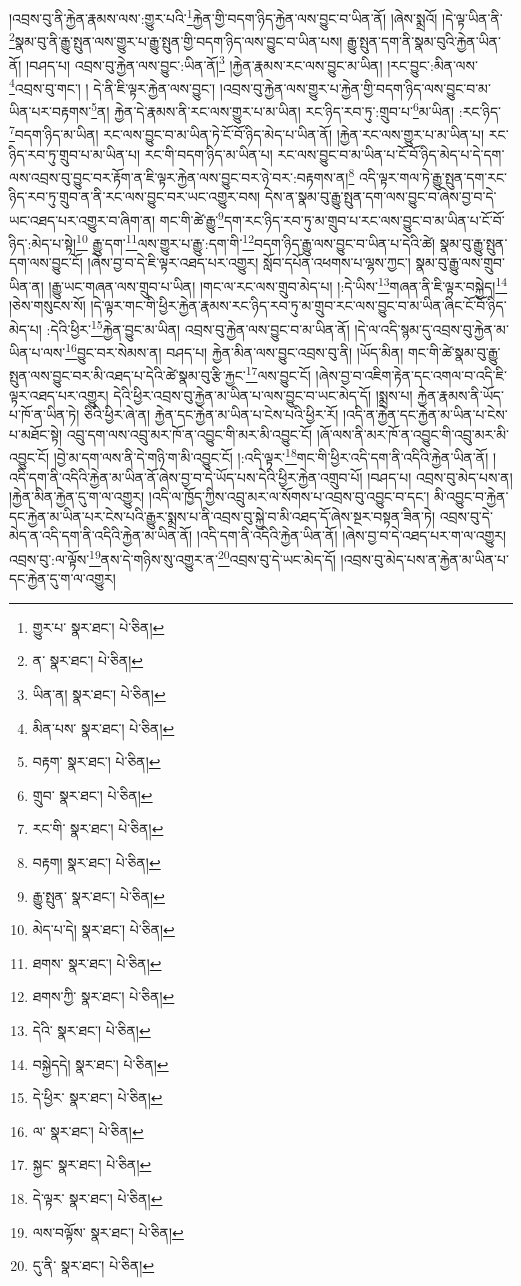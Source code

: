 །འབྲས་བུ་ནི་རྐྱེན་རྣམས་ལས་:གྱུར་པའི་\footnote{གྱུར་པ་  སྣར་ཐང་།  པེ་ཅིན། }རྐྱེན་གྱི་བདག་ཉིད་རྐྱེན་ལས་བྱུང་བ་ཡིན་ནོ། །ཞེས་སྨྲའོ། །དེ་ལྟ་ཡིན་ནི་\footnote{ན་  སྣར་ཐང་།  པེ་ཅིན། }སྣམ་བུ་ནི་རྒྱུ་སྤུན་ལས་གྱུར་པ་རྒྱུ་སྤུན་གྱི་བདག་ཉིད་ལས་བྱུང་བ་ཡིན་པས། རྒྱུ་སྤུན་དག་ནི་སྣམ་བུའི་རྐྱེན་ཡིན་ནོ། །བཤད་པ། འབྲས་བུ་རྐྱེན་ལས་བྱུང་:ཡིན་ནོ།\footnote{ཡིན་ན།  སྣར་ཐང་།  པེ་ཅིན། } །རྐྱེན་རྣམས་རང་ལས་བྱུང་མ་ཡིན། །རང་བྱུང་:མིན་ལས་\footnote{མིན་པས་  སྣར་ཐང་།  པེ་ཅིན། }འབྲས་བུ་གང་། །
དེ་ནི་ཇི་ལྟར་རྐྱེན་ལས་བྱུང་། །འབྲས་བུ་རྐྱེན་ལས་གྱུར་པ་རྐྱེན་གྱི་བདག་ཉིད་ལས་བྱུང་བ་མ་ཡིན་པར་བརྟགས་\footnote{བརྟག་  སྣར་ཐང་།  པེ་ཅིན། }ན། རྐྱེན་དེ་རྣམས་ནི་རང་ལས་གྱུར་པ་མ་ཡིན། རང་ཉིད་རབ་ཏུ་:གྲུབ་པ་\footnote{གྲུབ་  སྣར་ཐང་།  པེ་ཅིན། }མ་ཡིན། :རང་ཉིད་\footnote{རང་གི་  སྣར་ཐང་།  པེ་ཅིན། }བདག་ཉིད་མ་ཡིན། རང་ལས་བྱུང་བ་མ་ཡིན་ཏེ་ངོ་བོ་ཉིད་མེད་པ་ཡིན་ནོ། །རྐྱེན་རང་ལས་གྱུར་པ་མ་ཡིན་པ། རང་ཉིད་རབ་ཏུ་གྲུབ་པ་མ་ཡིན་པ། རང་གི་བདག་ཉིད་མ་ཡིན་པ། རང་ལས་བྱུང་བ་མ་ཡིན་པ་ངོ་བོ་ཉིད་མེད་པ་དེ་དག་ལས་འབྲས་བུ་བྱུང་བར་རྟོག་ན་ཇི་ལྟར་རྐྱེན་ལས་བྱུང་བར་ཉེ་བར་:བརྟགས་ན།\footnote{བརྟག།  སྣར་ཐང་།  པེ་ཅིན། } འདི་ལྟར་གལ་ཏེ་རྒྱུ་སྤུན་དག་རང་ཉིད་རབ་ཏུ་གྲུབ་ན་ནི་རང་ལས་བྱུང་བར་ཡང་འགྱུར་བས། དེས་ན་སྣམ་བུ་རྒྱུ་སྤུན་དག་ལས་བྱུང་བ་ཞེས་བྱ་བ་དེ་ཡང་འཐད་པར་འགྱུར་བ་ཞིག་ན། གང་གི་ཚེ་རྒྱུ་\footnote{རྒྱུ་སྤུན་  སྣར་ཐང་།  པེ་ཅིན། }དག་རང་ཉིད་རབ་ཏུ་མ་གྲུབ་པ་རང་ལས་བྱུང་བ་མ་ཡིན་པ་ངོ་བོ་ཉིད་:མེད་པ་སྟེ།\footnote{མེད་པ་དེ།  སྣར་ཐང་།  པེ་ཅིན། } རྒྱུ་དག་\footnote{ཐགས་  སྣར་ཐང་།  པེ་ཅིན། }ལས་གྱུར་པ་རྒྱུ་:དག་གི་\footnote{ཐགས་ཀྱི་  སྣར་ཐང་།  པེ་ཅིན། }བདག་ཉིད་རྒྱུ་ལས་བྱུང་བ་ཡིན་པ་དེའི་ཚེ། སྣམ་བུ་རྒྱུ་སྤུན་དག་ལས་བྱུང་ངོ། །ཞེས་བྱ་བ་དེ་ཇི་ལྟར་འཐད་པར་འགྱུར། སློབ་དཔོན་འཕགས་པ་ལྷས་ཀྱང་། སྣམ་བུ་རྒྱུ་ལས་གྲུབ་ཡིན་ན། །རྒྱུ་ཡང་གཞན་ལས་གྲུབ་པ་ཡིན། །གང་ལ་རང་ལས་གྲུབ་མེད་པ། །:དེ་ཡིས་\footnote{དེའི་  སྣར་ཐང་།  པེ་ཅིན། }གཞན་ནི་ཇི་ལྟར་བསྐྱེད།\footnote{བསྐྱེདདེ།  སྣར་ཐང་།  པེ་ཅིན། } །ཅེས་གསུངས་སོ། །དེ་ལྟར་གང་གི་ཕྱིར་རྐྱེན་རྣམས་རང་ཉིད་རབ་ཏུ་མ་གྲུབ་རང་ལས་བྱུང་བ་མ་ཡིན་ཞིང་ངོ་བོ་ཉིད་མེད་པ། :དེའི་ཕྱིར་\footnote{དེ་ཕྱིར་  སྣར་ཐང་།  པེ་ཅིན། }རྐྱེན་བྱུང་མ་ཡིན། འབྲས་བུ་རྐྱེན་ལས་བྱུང་བ་མ་ཡིན་ནོ། །དེ་ལ་འདི་སྙམ་དུ་འབྲས་བུ་རྐྱེན་མ་ཡིན་པ་ལས་\footnote{ལ་  སྣར་ཐང་།  པེ་ཅིན། }བྱུང་བར་སེམས་ན། བཤད་པ། རྐྱེན་མིན་ལས་བྱུང་འབྲས་བུ་ནི། །ཡོད་མིན། གང་གི་ཚེ་སྣམ་བུ་རྒྱུ་སྤུན་ལས་བྱུང་བར་མི་འཐད་པ་དེའི་ཚེ་སྣམ་བུ་རྩི་རྐྱང་\footnote{སྐྱང་  སྣར་ཐང་།  པེ་ཅིན། }ལས་བྱུང་ངོ། །ཞེས་བྱ་བ་འཇིག་རྟེན་དང་འགལ་བ་འདི་ཇི་ལྟར་འཐད་པར་འགྱུར། དེའི་ཕྱིར་འབྲས་བུ་རྐྱེན་མ་ཡིན་པ་ལས་བྱུང་བ་ཡང་མེད་དོ། །སྨྲས་པ། རྐྱེན་རྣམས་ནི་ཡོད་པ་ཁོ་ན་ཡིན་ཏེ། ཅིའི་ཕྱིར་ཞེ་ན། རྐྱེན་དང་རྐྱེན་མ་ཡིན་པ་ངེས་པའི་ཕྱིར་རོ། །འདི་ན་རྐྱེན་དང་རྐྱེན་མ་ཡིན་པ་ངེས་པ་མཐོང་སྟེ། འབྲུ་དག་ལས་འབྲུ་མར་ཁོ་ན་འབྱུང་གི་མར་མི་འབྱུང་ངོ། །ཞོ་ལས་ནི་མར་ཁོ་ན་འབྱུང་གི་འབྲུ་མར་མི་འབྱུང་ངོ། །བྱེ་མ་དག་ལས་ནི་དེ་གཉི་ག་མི་འབྱུང་ངོ། །:འདི་ལྟར་\footnote{དེ་ལྟར་  སྣར་ཐང་།  པེ་ཅིན། }གང་གི་ཕྱིར་འདི་དག་ནི་འདིའི་རྐྱེན་ཡིན་ནོ། །འདི་དག་ནི་འདིའི་རྐྱེན་མ་ཡིན་ནོ་ཞེས་བྱ་བ་དེ་ཡོད་པས་དེའི་ཕྱིར་རྐྱེན་འགྲུབ་པོ། །བཤད་པ། འབྲས་བུ་མེད་པས་ན། །རྐྱེན་མིན་རྐྱེན་དུ་ག་ལ་འགྱུར། །འདི་ལ་ཁྱོད་ཀྱིས་འབྲུ་མར་ལ་སོགས་པ་འབྲས་བུ་འབྱུང་བ་དང་། མི་འབྱུང་བ་རྐྱེན་དང་རྐྱེན་མ་ཡིན་པར་ངེས་པའི་རྒྱུར་སྨྲས་པ་ནི་འབྲས་བུ་སྐྱེ་བ་མི་འཐད་དོ་ཞེས་སྔར་བསྟན་ཟིན་ཏེ། འབྲས་བུ་དེ་མེད་ན་འདི་དག་ནི་འདིའི་རྐྱེན་མ་ཡིན་ནོ། །འདི་དག་ནི་འདིའི་རྐྱེན་ཡིན་ནོ། །ཞེས་བྱ་བ་དེ་འཐད་པར་ག་ལ་འགྱུར། འབྲས་བུ་:ལ་ལྟོས་\footnote{ལས་བལྟོས་  སྣར་ཐང་།  པེ་ཅིན། }ནས་དེ་གཉིས་སུ་འགྱུར་ན་\footnote{དུ་ནི་  སྣར་ཐང་།  པེ་ཅིན། }འབྲས་བུ་དེ་ཡང་མེད་དོ། །འབྲས་བུ་མེད་པས་ན་རྐྱེན་མ་ཡིན་པ་དང་རྐྱེན་དུ་ག་ལ་འགྱུར། 